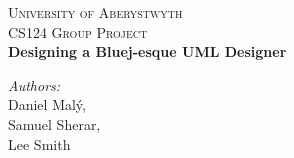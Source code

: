 \begin{titlepage}
\begin{center}
{\vspace*{8.5cm}}


\textsc{\LARGE University of Aberystwyth}\\[1.5cm]

\textsc{\Large CS124 Group Project}\\[0.5cm]

{ \huge \bfseries Designing a Bluej-esque UML Designer}\\[0.4cm]

\begin{minipage}{0.4\textwidth}
\begin{center} \large
\emph{Authors:}\\
Daniel Mal\'{y},\\ Samuel Sherar,\\ Lee Smith
\end{center}
\end{minipage}

\vfill


\end{center}

\end{titlepage}